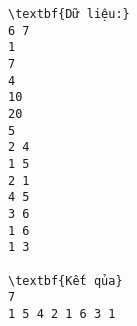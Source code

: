 \begin{verbatim}
\textbf{Dữ liệu:}
6 7
1
7
4
10
20
5
2 4
1 5
2 1
4 5
3 6
1 6
1 3

\textbf{Kết qủa}
7
1 5 4 2 1 6 3 1
\end{verbatim}